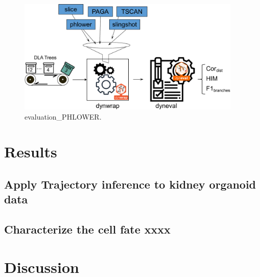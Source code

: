 \begin{figure}[!ht]
	\centering
	\includegraphics[width=0.95\textwidth]{evaluation_PHLOWER/fig}
	\vspace{0.1cm}
	\caption[evaluation\_PHLOWER]{
	evaluation\_PHLOWER.}
	\label{fig:evaluation_PHLOWER}
\end{figure}

\section{Results}
\subsection{Apply Trajectory inference to kidney organoid data}
\subsection{Characterize the cell fate xxxx}

\section{Discussion}

